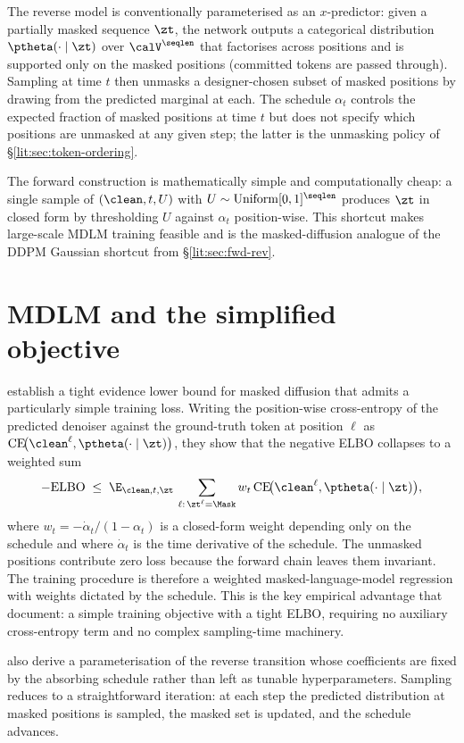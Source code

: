 The reverse model is conventionally parameterised as an $x$-predictor:
given a partially masked sequence $\zt$, the network outputs a categorical
distribution $\ptheta(\cdot\mid \zt)$ over $\calV^{\seqlen}$ that factorises
across positions and is supported only on the masked positions (committed
tokens are passed through). Sampling at time $t$ then unmasks a
designer-chosen subset of masked positions by drawing from the predicted
marginal at each. The schedule $\alpha_t$ controls the expected fraction of
masked positions at time $t$ but does not specify which positions are
unmasked at any given step; the latter is the unmasking policy of
\S\ref{lit:sec:token-ordering}.

The forward construction is mathematically simple and computationally
cheap: a single sample of $(\clean,t,U)$ with
$U\sim\mathrm{Uniform}[0,1]^{\seqlen}$ produces $\zt$ in closed form by
thresholding $U$ against $\alpha_t$ position-wise. This shortcut makes
large-scale MDLM training feasible and is the masked-diffusion analogue of
the DDPM Gaussian shortcut from \S\ref{lit:sec:fwd-rev}.

\section{MDLM and the simplified objective}
\label{lit:sec:mdlm}

\textcite{sahoo2024mdlm} establish a tight evidence lower bound for masked
diffusion that admits a particularly simple training loss. Writing the
position-wise cross-entropy of the predicted denoiser against the
ground-truth token at position $\ell$ as
$\mathrm{CE}\!\big(\clean^\ell, \ptheta(\cdot\mid \zt)\big)$, they show that
the negative ELBO collapses to a weighted sum
\[
  -\mathrm{ELBO}
  \;\leq\;
  \E_{\clean,t,\zt}\,
  \sum_{\ell:\, \zt^\ell = \Mask}
    w_t\,\mathrm{CE}\!\big(\clean^\ell, \ptheta(\cdot\mid \zt)\big),
\]
where $w_t = -\dot\alpha_t/(1-\alpha_t)$ is a closed-form weight depending
only on the schedule and where $\dot\alpha_t$ is the time derivative of the
schedule. The unmasked positions contribute zero loss because the forward
chain leaves them invariant. The training procedure is therefore a weighted
masked-language-model regression with weights dictated by the schedule.
This is the key empirical advantage that \textcite{sahoo2024mdlm} document:
a simple training objective with a tight ELBO, requiring no auxiliary
cross-entropy term and no complex sampling-time machinery.

\textcite{sahoo2024mdlm} also derive a parameterisation of the reverse
transition whose coefficients are fixed by the absorbing schedule rather
than left as tunable hyperparameters. Sampling reduces to a straightforward
iteration: at each step the predicted distribution at masked positions is
sampled, the masked set is updated, and the schedule advances.

